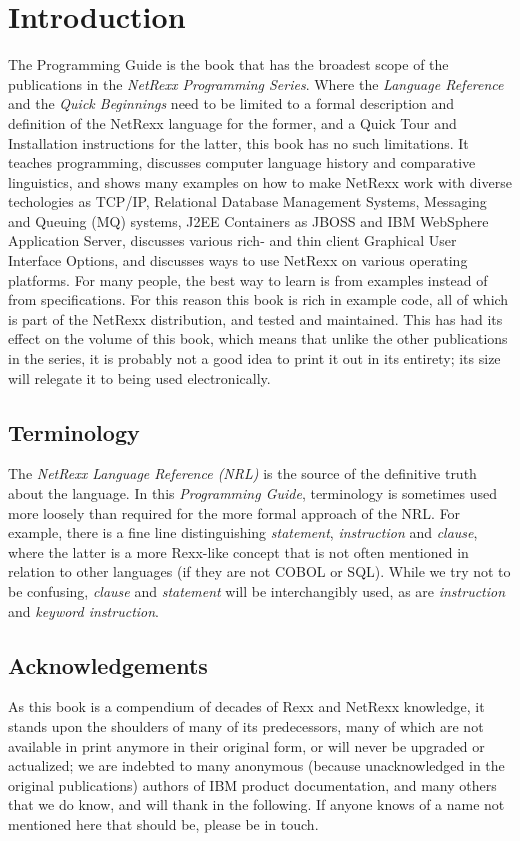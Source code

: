 \chapter{Introduction}
The Programming Guide is the book that has the broadest scope of the publications in the \emph{NetRexx Programming Series}. Where the \emph{Language Reference} and the \emph{Quick Beginnings} need to be limited to a formal description and definition of the NetRexx language for the former, and a Quick Tour and Installation instructions for the latter, this book has no such limitations. It teaches programming, discusses computer language history and comparative linguistics, and shows many examples on how to make NetRexx work with diverse techologies as TCP/IP, Relational Database Management Systems, Messaging and Queuing (MQ\textsuperscript{\texttrademark}) systems, J2EE Containers as JBOSS\textsuperscript{\texttrademark} and IBM WebSphere Application Server\textsuperscript{\texttrademark}, discusses various rich- and thin client Graphical User Interface Options, and discusses ways to use NetRexx on various operating platforms. For many people, the best way to learn is from examples instead of from specifications. For this reason this book is rich in example code, all of which is part of the NetRexx distribution, and tested and maintained. This has had its effect on the volume of this book, which means that unlike the other publications in the series, it is probably not a good idea to print it out in its entirety; its size will relegate it to being used electronically.
\section*{Terminology}
The \emph{NetRexx Language Reference (NRL)} is the source of the definitive truth about the language. In this \emph{Programming Guide}, terminology is sometimes used more loosely than required for the more formal approach of the NRL. For example, there is a fine line distinguishing \emph{statement}, \emph{instruction} and \emph{clause}, where the latter is a more Rexx-like concept that is not often mentioned in relation to other languages (if they are not COBOL or SQL). While we try not to be confusing, \emph{clause} and \emph{statement} will be interchangibly used, as are \emph{instruction} and \emph{keyword instruction}.
\section*{Acknowledgements}
As this book is a compendium of decades of Rexx and NetRexx knowledge, it stands upon the shoulders of many of its predecessors, many of which are not available in print anymore in their original form, or will never be upgraded or actualized; we are indebted to many anonymous (because unacknowledged in the original publications) authors of IBM product documentation, and many others that we do know, and will thank in the following. If anyone knows of a name not mentioned here that should be, please be in touch. 

